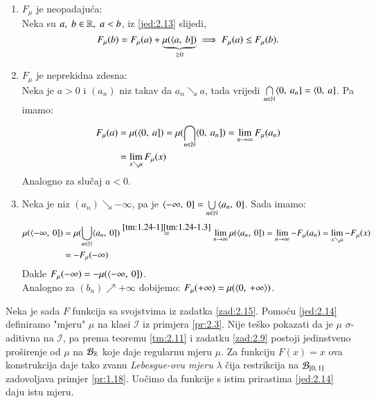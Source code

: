 \begin{rj}[\ref{zad:2.15}]  \label{rj:2.15}
    \begin{enumerate}[label=\arabic*.]
        \item $F_{\mu}$ je neopadaju\' ca:\\
        Neka su $a, \; b \in \mathbb{R}, \; a < b$, iz \eqref{jed:2.13} slijedi,
        \begin{equation*}
            F_\mu (b) = F_\mu (a) + \underbrace{\mu (\langle {a}, \: {b}])}_{\geq 0} \implies F_\mu (a) \leq F_\mu (b).
        \end{equation*}
        \item $F_\mu$ je neprekidna zdesna:\\
        Neka je $a > 0$ i $(a_n)$ niz takav da $a_n \searrow a$, tada vrijedi $\bigcap\limits_{n \in \mathbb{N}}^{} \langle {0}, \: {a_n}] = \langle {0}, \: {a}]$.
        Pa imamo:
        \begin{equation*}
            \begin{aligned}
                F_\mu (a) &= \mu(\langle {0}, \: {a}]) = \mu (\bigcap\limits_{n \in \mathbb{N}}^{} \langle {0}, \: {a_n}]) = \lim\limits_{n \to \infty} F_\mu (a_n)\\
                &= \lim_{x \searrow a} F_\mu (x)
            \end{aligned}
        \end{equation*}
        Analogno za slu\v caj $a < 0$.
        \item Neka je niz $(a_n) \searrow -\infty$, pa je $\langle {-\infty}, \: {0}] = \bigcup\limits_{n \in \mathbb{N}}^{} \langle {a_n}, \: {0}]$.
        Sada imamo:
        \begin{equation*}
            \begin{aligned}
                \mu (\langle {-\infty}, \: {0}]) &= \mu (\bigcup\limits_{n \in \mathbb{N}}^{} \langle {a_n}, \: {0}]) \overset{\ref{tm:1.24-1} \ref{tm:1.24-1.3}}{=} \lim\limits_{n \to \infty} \mu({\langle {a_n}, \: {0}]}) = \lim\limits_{n \to \infty} - F_\mu (a_n) = \lim\limits_{x \searrow a} - F_\mu (x)\\
                &= - F_\mu (-\infty)
            \end{aligned}
        \end{equation*}
        Dakle $F_\mu (-\infty) = - \mu (\langle {-\infty}, \: {0}])$.\\
        Analogno za $(b_n) \nearrow +\infty$ dobijemo:
        $F_\mu (+\infty) = \mu (\langle {0}, \: {+\infty} \rangle)$.
    \end{enumerate}
\end{rj}

Neka je sada $F$ funkcija sa svojstvima iz zadatka \ref{zad:2.15}.
Pomo\' cu \eqref{jed:2.14} definiramo "mjeru" $\mu$ na klasi $\mathcal{I}$ iz primjera \eqref{pr:2.3}.
Nije te\v sko pokazati da je $\mu$ $\sigma$-aditivna na $\mathcal{I}$, pa prema teoremu \ref{tm:2.11} i zadatku \ref{zad:2.9} postoji jedinstveno pro\v sirenje od $\mu$ na $\mathcal{B}_{\mathbb{R}}$ koje daje regularnu mjeru $\mu$.
Za funkciju $F(x) = x$ ova konstrukcija daje tako zvanu \emph{Lebesgue-ovu mjeru} $\lambda$ \v cija restrikcija na $\mathcal{B}_{[{0}, \:{1}]}$ zadovoljava primjer \ref{pr:1.18}.
Uo\v cimo da funkcije s istim prirastima \eqref{jed:2.14} daju istu mjeru.